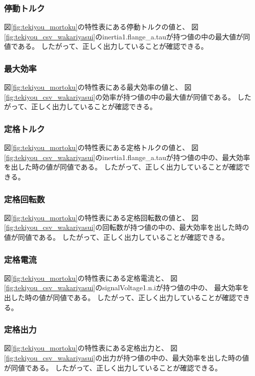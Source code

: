 \subsubsection{停動トルク}
図\ref{fig:tekiyou_mortoku}の特性表にある停動トルクの値と、
図\ref{fig:tekiyou_csv_wakariyasui}のinertia1.flange\_a.tauが持つ値の中の最大値が同値である。
したがって、正しく出力していることが確認できる。

\subsubsection{最大効率}
図\ref{fig:tekiyou_mortoku}の特性表にある最大効率の値と、
図\ref{fig:tekiyou_csv_wakariyasui}の効率が持つ値の中の最大値が同値である。
したがって、正しく出力していることが確認できる。

\subsubsection{定格トルク}
図\ref{fig:tekiyou_mortoku}の特性表にある定格トルクの値と、
図\ref{fig:tekiyou_csv_wakariyasui}のinertia1.flange\_a.tauが持つ値の中の、最大効率を出した時の値が同値である。
したがって、正しく出力していることが確認できる。

\subsubsection{定格回転数}
図\ref{fig:tekiyou_mortoku}の特性表にある定格回転数の値と、
図\ref{fig:tekiyou_csv_wakariyasui}の回転数が持つ値の中の、最大効率を出した時の値が同値である。
したがって、正しく出力していることが確認できる。

\subsubsection{定格電流}
図\ref{fig:tekiyou_mortoku}の特性表にある定格電流と、
図\ref{fig:tekiyou_csv_wakariyasui}のsignalVoltage1.n.iが持つ値の中の、
最大効率を出した時の値が同値である。
したがって、正しく出力していることが確認できる。

\subsubsection{定格出力}
図\ref{fig:tekiyou_mortoku}の特性表にある定格出力と、
図\ref{fig:tekiyou_csv_wakariyasui}の出力が持つ値の中の、最大効率を出した時の値が同値である。
したがって、正しく出力していることが確認できる。

